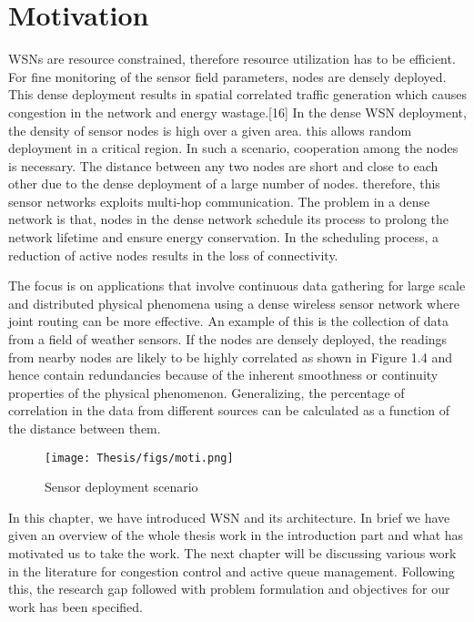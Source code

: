\section{Motivation}
WSNs are resource constrained, therefore resource utilization has to be efficient. For fine monitoring of the sensor field parameters, nodes are densely deployed. This dense deployment results in spatial correlated traffic generation which causes congestion in the network and energy wastage.[16] In the dense WSN deployment, the density of sensor nodes is high over a given area. this allows random deployment in a critical region. In such a scenario, cooperation among the nodes is necessary. The distance between any two nodes are short and close to each other due to the dense deployment of a large number of nodes. therefore, this sensor networks exploits multi-hop communication. The problem in a dense network is that, nodes in the dense network schedule its process to prolong the network lifetime and ensure energy conservation. In the scheduling process, a reduction of active nodes results in the loss of connectivity.
\par
The focus is on applications that involve continuous data gathering for large scale and distributed physical phenomena using a dense wireless sensor network where joint routing can be more effective. An example of this is the collection of data from a field of weather sensors. If the nodes are densely deployed, the readings from nearby nodes are likely to be highly correlated as shown in Figure 1.4 and hence contain redundancies because of the inherent smoothness or continuity properties of the physical phenomenon.
Generalizing, the percentage of correlation in the data from different sources can be calculated as a function of the distance between them. \\
\begin{figure}[H]
    \centering
    \texttt{[image: Thesis/figs/moti.png]}
    \caption{Sensor deployment scenario}
    \label{fig:my_label}
\end{figure}
\par
In this chapter, we have introduced WSN and its architecture. In brief we have given an overview of the whole thesis work in the introduction part and what has motivated us to take the work. The next chapter will be discussing various work in the literature for congestion control and active queue management. Following this, the research gap followed with problem formulation and objectives for our work has been specified.



